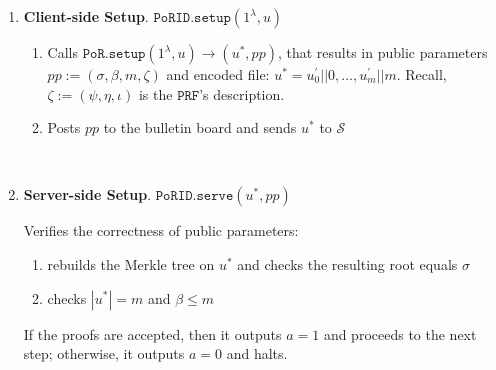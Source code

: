 

\begin{enumerate}
\item\textbf{Client-side Setup}. $\mathtt{PoRID.setup}(1^{\lambda}, u)$
\begin{enumerate}
\item Calls  $\mathtt{PoR.setup}(1^{\lambda}, u)\rightarrow (u^{\scriptscriptstyle *},pp)$, that results in public parameters $pp:=(\sigma,\beta,m,\zeta)$ and encoded file: $u^{\scriptscriptstyle *}=u^{\scriptscriptstyle '}_{\scriptscriptstyle 0}||0,...,u^{\scriptscriptstyle '}_{\scriptscriptstyle m}||m$. Recall,  $\zeta:=(\psi,\eta, \iota)$ is the $\mathtt{PRF}$'s description.

\item Posts $pp$ to the bulletin board and sends $u^{\scriptscriptstyle *}$ to $\mathcal{S}$ 
\end{enumerate}

\

\item\textbf{Server-side Setup}. $\mathtt{PoRID.serve}(u^{\scriptscriptstyle *},pp)$

Verifies the correctness of public parameters:
\begin{enumerate}
\item rebuilds  the Merkle tree on $u^{\scriptscriptstyle *}$ and checks the resulting root equals $\sigma$
\item checks $|u^{*}|=m$ and  $\beta\leq m$
\end{enumerate}
 If the proofs are accepted, then  it outputs $a = 1$ and proceeds to the next step; otherwise, it outputs $a = 0$ and halts.
 

\end{enumerate}
